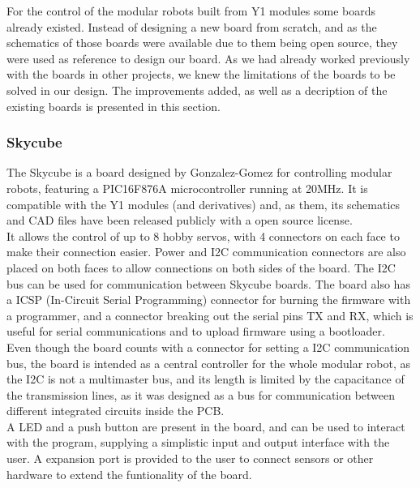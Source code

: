For the control of the modular robots built from Y1 modules some boards already existed. Instead of designing a new board from scratch, and as the schematics of those boards were available due to them being open source, they were used as reference to design our board. As we had already worked previously with the boards in other projects, we knew the limitations of the boards to be solved in our design. The improvements added, as well as a decription of the existing boards is presented in this section.\\

\subsubsection{Skycube}
\label{hardware_skycube}

The Skycube \cite{gonzalez-gomez_website:skycube} is a board designed by Gonzalez-Gomez for controlling modular robots, featuring a PIC16F876A microcontroller running at 20MHz. It is compatible with the Y1 modules (and derivatives) and, as them, its schematics and CAD files have been released publicly with a open source license.\\

It allows the control of up to 8 hobby servos, with 4 connectors on each face to make their connection easier. Power and I2C communication connectors are also placed on both faces to allow connections on both sides of the board. The I2C bus can be used for communication between Skycube boards. The board also has a ICSP (In-Circuit Serial Programming) connector for burning the firmware with a programmer, and a connector breaking out the serial pins TX and RX, which is useful for serial communications and to upload firmware using a bootloader.\\

Even though the board counts with a connector for setting a I2C communication bus, the board is intended as a central controller for the whole modular robot, as the I2C is not a multimaster bus, and its length is limited by the capacitance of the transmission lines, as it was designed as a bus for communication between different integrated circuits inside the PCB.\\

A LED and a push button are present in the board, and can be used to interact with the program, supplying a simplistic input and output interface with the user. A expansion port is provided to the user to connect sensors or other hardware to extend the funtionality of the board.

